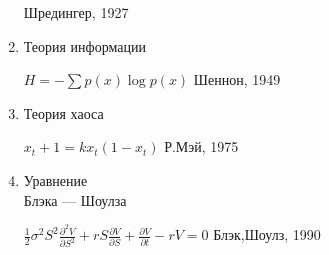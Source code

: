 \documentclass[12pt]{article}
\begin{document}
\begin{k}
\begin{enumerate}
\begin{minipage}[t]{100mm}
    \hfill Шредингер, 1927 \end{minipage}
 \item Теория информации \hfill
  \begin{minipage}[t]{100mm} $H = - \sum p(x)\log p(x)$ \hfill Шеннон, 1949
   \end{minipage}
 \item Теория хаоса  \hfill \begin{minipage}[t]{100mm} $x_t+1 = kx_t(1-x_t)$  \hfill Р.Мэй, 1975 \end{minipage}
   \item \begin{minipage}[t]{45mm} Уравнение \\Блэка — Шоулза\\ \end{minipage}
  \hfill 
 \begin{minipage}[t]{100mm}  $\frac{1}{2}\sigma^2 S^2 \frac{\partial^2 V}{\partial S^2}+rS \frac{\partial V}{\partial S}+\frac{\partial V}{\partial t}-rV = 0$ \hfill Блэк,Шоулз, 1990 \end{minipage}
\end{enumerate}
\end{k}
\end{document}
